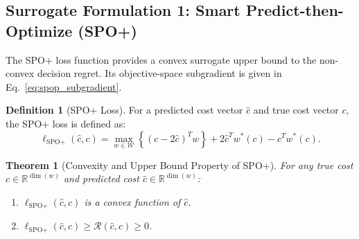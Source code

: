 \documentclass[11pt,a4paper]{article}
\newtheorem{theorem}{Theorem}
\theoremstyle{definition}
\newtheorem{definition}{Definition}
\theoremstyle{remark}
\begin{document}
\subsection{Surrogate Formulation 1: Smart Predict-then-Optimize (SPO+)}
The SPO+ loss function \citep{elmachtoub2022smart} provides a convex surrogate upper bound to the non-convex decision regret. Its objective-space subgradient is given in Eq.~\eqref{eq:spop_subgradient}.

\begin{definition}[SPO+ Loss]
For a predicted cost vector $\hat{c}$ and true cost vector $c$, the SPO+ loss is defined as:
\begin{equation}
    \ell_{\text{SPO}+}(\hat{c}, c) = \max_{w \in \mathcal{W}} \left\{ (c - 2\hat{c})^T w \right\} + 2\hat{c}^T w^*(c) - c^T w^*(c). \label{eq:spop_def}
\end{equation}
\end{definition}

\begin{theorem}[Convexity and Upper Bound Property of SPO+]
\label{thm:spop_properties}
For any true cost $c \in \mathbb{R}^{\dim(w)}$ and predicted cost $\hat{c} \in \mathbb{R}^{\dim(w)}$:
\begin{enumerate}[label=(\roman*)]
    \item $\ell_{\text{SPO}+}(\hat{c}, c)$ is a convex function of $\hat{c}$.
    \item $\ell_{\text{SPO}+}(\hat{c}, c) \ge \mathcal{R}(\hat{c}, c) \ge 0$.
\end{enumerate}
\end{theorem}
\end{document}

